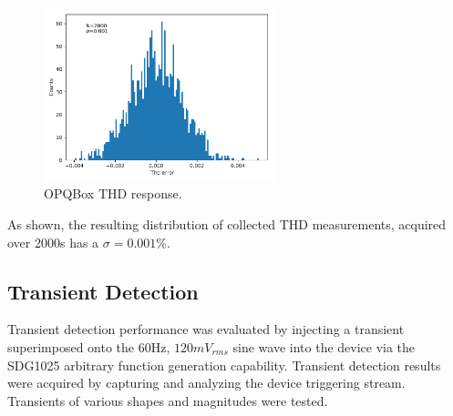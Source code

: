 \begin{figure}[h]
    \begin{center}
        \includegraphics[width=0.6\textwidth]{img/box_eval/thd_rms.pdf}
    \end{center}
    \caption{OPQBox THD response.}
    \label{fig:expdes:3}
\end{figure}

As shown, the resulting distribution of collected THD measurements, acquired over 2000s has a $\sigma=0.001\%$.

\subsection{Transient Detection}

Transient detection performance was evaluated by injecting a transient superimposed onto the 60Hz, $120mV_{rms}$ sine wave into the device via the SDG1025 arbitrary function generation capability.
Transient detection results were acquired by capturing and analyzing the device triggering stream.
Transients of various shapes and magnitudes were tested.

